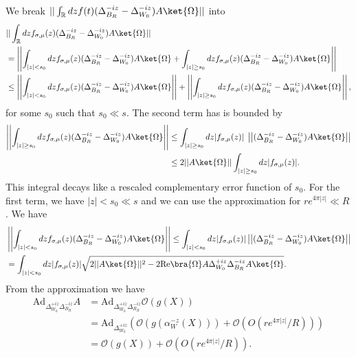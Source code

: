 \documentclass[a4paper,11pt]{article}
\theoremstyle{definition}
\theoremstyle{remark}
\newcommand{\nn}{\nonumber}
\begin{document}
We break $||\int_\mathbb{R} dz f(t)(\Delta_{B_R}^{-iz} - \Delta_{W_0}^{-iz})A\ket{\Omega}||$ into
\begin{align}
    &||\int_\mathbb{R} dz f_{\sigma,\mu}(z)(\Delta_{B_R}^{-iz} - \Delta_{W_0}^{-iz})A\ket{\Omega}|| \nn\\
    &=\left|\left|\int_{|z|<s_0} dz f_{\sigma,\mu}(z) (\Delta_{B_R}^{-iz} - \Delta_{W_0}^{-iz})A\ket{\Omega}+\int_{|z|\geq s_0} dz f_{\sigma,\mu}(z)(\Delta_{B_R}^{-iz} - \Delta_{W_0}^{-iz})A\ket{\Omega}\right|\right|\\
    & \leq \left|\left|\int_{|z|<s_0} dz f_{\sigma,\mu}(z) (\Delta_{B_R}^{-iz} - \Delta_{W_0}^{-iz})A\ket{\Omega}\right|\right| + \left|\left| \int_{|z|\geq s_0} dz f_{\sigma,\mu}(z)(\Delta_{B_R}^{-iz} - \Delta_{W_0}^{-iz})A\ket{\Omega}\right|\right|,
\end{align}
for some $s_0$ such that $s_0\ll s$. The second term has is bounded by
\begin{align}
    \left|\left|\int_{|z|\geq s_0} dz f_{\sigma,\mu}(z)(\Delta_{B_R}^{-iz} - \Delta_{W_0}^{-iz})A\ket{\Omega}\right|\right| &\leq \int_{|z|\geq s_0} dz |f_{\sigma,\mu}(z)|\;\left|\left|(\Delta_{B_R}^{-iz} - \Delta_{W_0}^{-iz})A\ket{\Omega}\right|\right|\\
    &\leq 2||A\ket{\Omega}|| \int_{|z|\geq s_0} dz |f_{\sigma,\mu}(z)| .
\end{align}
This integral decays like a rescaled complementary error function of $s_0$. For the first term, we have $|z|< s_0\ll s$ and we can use the approximation for $re^{4\pi|z|}\ll R$. We have
\begin{align}
    &\left|\left|\int_{|z|<s_0} dz f_{\sigma,\mu}(z) (\Delta_{B_R}^{-iz} - \Delta_{W_0}^{-iz})A\ket{\Omega}\right|\right| \leq \int_{|z|<s_0} dz |f_{\sigma,\mu}(z)| \left|\left|(\Delta_{B_R}^{-iz} - \Delta_{W_0}^{-iz})A\ket{\Omega}\right|\right| \\
    &= \int_{|z|<s_0} dz |f_{\sigma,\mu}(z)| \sqrt{2||A\ket{\Omega}||^2 - 2\text{Re}\bra{\Omega}A \Delta_{W_0}^{+iz}\Delta_{B_R}^{-iz} A\ket{\Omega}}.
\end{align}
From the approximation we have
\begin{align}
    \text{Ad}_{\Delta_{W_0}^{+iz}\Delta_{B_R}^{-iz}} A &= \text{Ad}_{\Delta_{W_0}^{+iz}\Delta_{B_R}^{-iz}} \mathcal{O}(g(X))\\
    & = \text{Ad}_{\Delta_{W_0}^{+iz}} \left(\mathcal{O}(g(\alpha_{W}^{-z}(X))) + \mathcal{O}(O(re^{4\pi|z|}/R))\right)\\
    & = \mathcal{O}(g(X)) + \mathcal{O}(O(re^{4\pi|z|}/R)).
\end{align}
\end{document}
